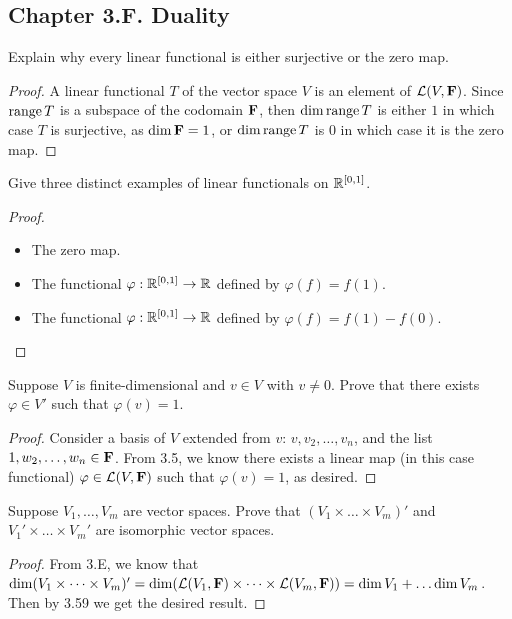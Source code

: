 \subsection*{Chapter 3.F. Duality}


\begin{exercise}{1}
  Explain why every linear functional is either surjective or the zero map.
\end{exercise}
\begin{proof}
 A linear functional $T$ of the vector space $V$ is an element of $\mathcal{L}(V,\mathbf{F})$. Since $\operatorname*{range} T$ is a subspace of the codomain $\mathbf{F}$, then $\dim\operatorname*{range} T$ is either $1$ in which case $T$ is surjective, as $\dim\mathbf{F}=1$, or $\dim\operatorname*{range} T$ is $0$ in which case it is the zero map.
\end{proof}

\begin{exercise}{2}
  Give three distinct examples of linear functionals on $\mathbb{R}^{[0,1]}$.
\end{exercise}
\begin{proof}
 \begin{itemize}
     \item The zero map.
     \item The functional $\varphi:\mathbb{R}^{[0,1]}\rightarrow\mathbb{R}$ defined by $\varphi(f)=f(1)$.
     \item The functional $\varphi:\mathbb{R}^{[0,1]}\rightarrow\mathbb{R}$ defined by $\varphi(f)=f(1)-f(0)$.
 \end{itemize}
\end{proof}

\begin{exercise}{3}
  Suppose $V$ is finite-dimensional and $v\in V$ with $v\neq 0$. Prove that there exists $\varphi\in V'$ such that $\varphi(v)=1$.
\end{exercise}
\begin{proof}
 Consider a basis of $V$ extended from $v$: $v,v_2,\dots,v_n$, and the list\\ $1,w_2,\dots,w_n\in\mathbf{F}$. From 3.5, we know there exists a linear map (in this case functional) $\varphi\in\mathcal{L}(V,\mathbf{F})$ such that $\varphi(v)=1$, as desired.
\end{proof}

\begin{exercise}{5}
  Suppose $V_1,\dots,V_m$ are vector spaces. Prove that $(V_1\times\dots\times V_m)'$ and $V_1'\times\dots\times V_m'$ are isomorphic vector spaces.
\end{exercise}
\begin{proof}
 From 3.E, we know that $\dim(V_1\times\dots\times V_m)'= \dim(\mathcal{L}(V_1,\mathbf{F})\times\dots\times \mathcal{L}(V_m,\mathbf{F}))= \dim V_1+\dots\dim V_m$. Then by 3.59 we get the desired result.
\end{proof}

